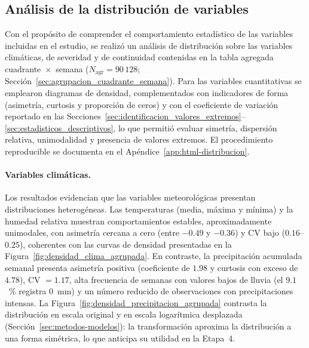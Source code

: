 \subsection{Análisis de la distribución de variables}
\label{sec:distribucion_variables}
    Con el propósito de comprender el comportamiento estadístico de las variables incluidas en el estudio, se realizó un análisis de distribución sobre las variables climáticas, de severidad y de continuidad contenidas en la tabla agregada cuadrante~$\times$~semana ($N_{\mathrm{agr}} = 90\,128$; Sección~\ref{sec:agrupacion_cuadrante_semana}). Para las variables cuantitativas se emplearon diagramas de densidad, complementados con indicadores de forma (asimetría, curtosis y proporción de ceros) y con el coeficiente de variación reportado en las Secciones~\ref{sec:identificacion_valores_extremos}--\ref{sec:estadisticos_descriptivos}, lo que permitió evaluar simetría, dispersión relativa, unimodalidad y presencia de valores extremos. El procedimiento reproducible se documenta en el Apéndice~\ref{app:html-distribucion}.
    
    \paragraph{Variables climáticas.} Los resultados evidencian que las variables meteorológicas presentan distribuciones heterogéneas. Las temperaturas (media, máxima y mínima) y la humedad relativa muestran comportamientos estables, aproximadamente unimodales, con asimetría cercana a cero (entre $-0{.}49$ y $-0{.}36$) y CV bajo ($0{.}16$--$0{.}25$), coherentes con las curvas de densidad presentadas en la Figura~\ref{fig:densidad_clima_agrupada}. En contraste, la precipitación acumulada semanal presenta asimetría positiva (coeficiente de $1{.}98$ y curtosis con exceso de $4{.}78$), CV $= 1{.}17$, alta frecuencia de semanas con valores bajos de lluvia (el $9{.}1$~\% registra $0$~mm) y un número reducido de observaciones con precipitaciones intensas. La Figura~\ref{fig:densidad_precipitacion_agrupada} contrasta la distribución en escala original y en escala logarítmica desplazada (Sección~\ref{sec:metodos-modelos}): la transformación aproxima la distribución a una forma simétrica, lo que anticipa su utilidad en la Etapa~4.
    
    

